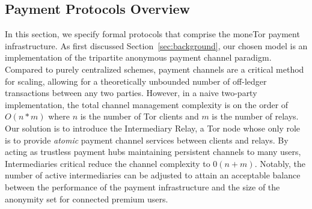 


\subsection{Payment Protocols Overview}
\label{sec:payment_overview}

In this section, we specify formal protocols that comprise the moneTor payment
infrastructure. As first discussed Section~\ref{sec:background}, our chosen
model is an implementation of the tripartite anonymous payment channel paradigm.
Compared to purely centralized schemes, payment channels are a critical method
for scaling, allowing for a theoretically unbounded number of off-ledger
transactions between any two parties. However, in a naive two-party
implementation, the total channel management complexity is on the order of
$O(n*m)$ where $n$ is the number of Tor clients and $m$ is the number of relays.
Our solution is to introduce the Intermediary Relay, a Tor node whose only role
is to provide \emph{atomic} payment channel services between clients and relays.
By acting as trustless payment hubs maintaining persistent channels to many
users, Intermediaries critical reduce the channel complexity to $0(n+m)$.
Notably, the number of active intermediaries can be adjusted to attain an
acceptable balance between the performance of the payment infrastructure and the
size of the anonymity set for connected premium users.

